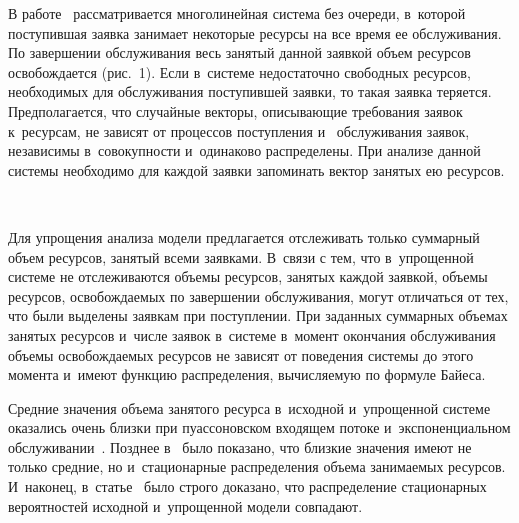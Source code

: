 \begin{multicols}{2}
  В работе~\cite{2-v} рассматривается многолинейная сис\-те\-ма без очереди, 
  в~которой поступившая заявка занимает некоторые ресурсы на все время ее 
обслуживания. По завершении обслуживания весь занятый данной заявкой 
объем ресурсов осво\-бож\-да\-ет\-ся (рис.~1). Если в~системе недостаточно 
свободных ресурсов, необходимых для обслуживания поступившей заявки, то 
такая заявка теряется. Предполагается, что случайные векторы, описывающие 
требования заявок к~ресурсам, не зависят от процессов поступления и~
обслуживания заявок, независимы в~совокупности и~одинаково распределены. 
При анализе данной системы необходимо для каждой заявки запоминать 
вектор занятых ею ресурсов. 
  \begin{figure*} %
           \vspace*{1pt}
 \begin{center}
 \mbox{%
 \epsfxsize=155.162mm
 }
 \end{center}
 \vspace*{-11pt}
  \end{figure*}
  
  Для упрощения анализа модели предлагается отслеживать только суммарный 
объем ресурсов, занятый всеми заявками. В~связи с тем, что в~упрощенной 
системе не отслеживаются объемы ресурсов, занятых каждой заявкой, объемы 
ресурсов, освобождаемых по завершении обслуживания, могут отличаться от 
тех, что были выделены заявкам при поступлении. При заданных суммарных 
объемах занятых ресурсов и~числе заявок в~системе в~момент окончания 
обслуживания объемы освобождаемых ресурсов не зависят от поведения 
системы до этого момента и~имеют функцию распределения, вы\-чис\-ля\-емую по 
формуле Байеса. 
  
  Средние значения объема занятого ресурса в~исходной и~упрощенной 
системе оказались очень близки при пуассоновском входящем потоке 
и~экспоненциальном обслуживании~\cite{2-v}. Позднее в~\cite{4-v} было 
показано, что близкие значения имеют не только средние, но и~стационарные 
распределения объема занимаемых ресурсов. И~наконец, в~статье~\cite{3-v} 
было строго доказано, что распределение стационарных вероятностей 
исходной и~упрощенной модели совпадают. 
  

\end{multicols}
